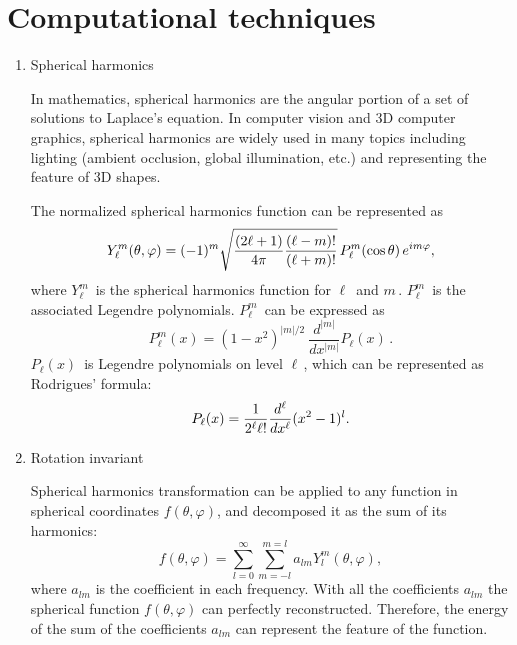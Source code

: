 \section{Computational techniques}
\label{computational_techniques}
\begin{enumerate}
\item Spherical harmonics

In mathematics, spherical harmonics are the angular portion of a set of solutions to Laplace's equation. In computer vision and 3D computer graphics, spherical harmonics are widely used in many topics including lighting (ambient occlusion, global illumination, etc.) and representing the feature of 3D shapes.

The normalized spherical harmonics function can be represented as 
\begin{equation} \label{spherical_harmonics}
Y_\ell^m( \theta , \varphi ) = (-1)^m \sqrt{{(2\ell+1)\over 4\pi}{(\ell-m)!\over (\ell+m)!}} \, P_\ell^m ( \cos{\theta} ) \, e^{i m \varphi },
\end{equation}
where $Y_\ell^m\,\!$ is the spherical harmonics function for $\ell\,\!$ and $m\,\!$. $P_\ell^m\,\!$ is the associated Legendre polynomials. $P_\ell^m\,\!$ can be expressed as 
\begin{equation} \label{legendre}
P_\ell^m(x) = (1 - x^2)^{|m|/2}\ \frac{d^{|m|}}{dx^{|m|}}P_\ell(x)\, .
\end{equation}
$P_\ell(x)\,\!$ is Legendre polynomials on level $\ell\,\!$, which can be represented as Rodrigues' formula:
\begin{equation} \label{rodrigues}
P_\ell(x) = {1 \over 2^\ell \ell!} {d^\ell\over dx^\ell }(x^2 - 1)^l.
\end{equation}

\item Rotation invariant

Spherical harmonics transformation can be applied to any function in spherical coordinates $f(\theta,\varphi)$, and decomposed it as the sum of its harmonics:
\begin{equation} \label{sphericalfunction}
f(\theta,\varphi)=\sum_{l=0}^{\infty}\sum_{m=-l}^{m=l}a_{lm}Y_{l}^{m}(\theta,\varphi),
\end{equation}
where $a_{lm}$ is the coefficient in each frequency. With all the coefficients $a_{lm}$ the spherical function $f(\theta,\varphi)$ can perfectly reconstructed. Therefore, the energy of the sum of the coefficients $a_{lm}$ can represent the feature of the function. 


\end{enumerate}

